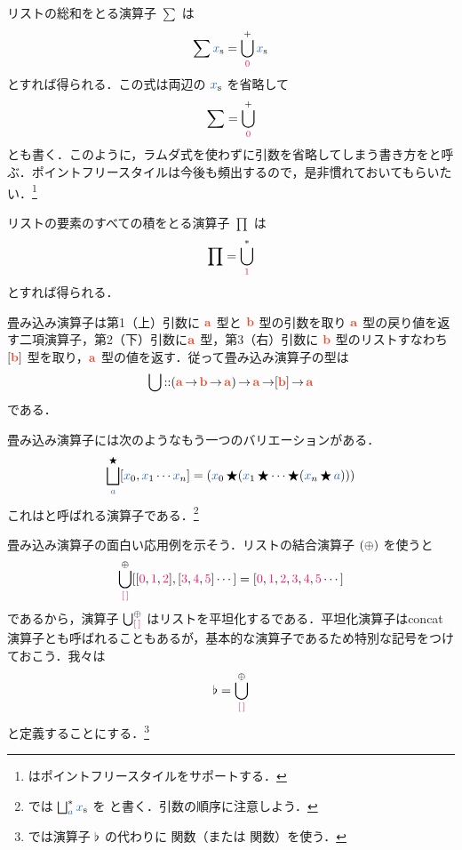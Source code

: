 \documentclass[a5paper,twoside,fleqn,draft]{jsbook}
\begin{document}
リストの総和をとる演算子 $\sum$ は
\begin{equation}
  \sum\mList{x}
  =\mFold^+_{\hConstant{0}}\mList{x}
\end{equation}
とすれば得られる．この式は両辺の $\mList{x}$ を省略して
\begin{equation}
  \sum
  =\mFold^+_{\hConstant{0}}
\end{equation}
とも書く．このように，ラムダ式を使わずに引数を省略してしまう書き方をと呼ぶ．ポイントフリースタイルは今後も頻出するので，是非慣れておいてもらいたい．\footnote{\haskell はポイントフリースタイルをサポートする．}

リストの要素のすべての積をとる演算子 $\prod$ は
\begin{equation}
  \prod
  =\mFold^*_{\hConstant{1}}
\end{equation}
とすれば得られる．

畳み込み演算子は第1（上）引数に $\mA$ 型と $\mB$ 型の引数を取り $\mA$ 型の戻り値を返す二項演算子，第2（下）引数に$\mA$ 型，第3（右）引数に $\mB$ 型のリストすなわち$[\mB]$ 型を取り，$\mA$ 型の値を返す．従って畳み込み演算子の型は
\begin{equation}
  \mFold
  \mIn(\mA\mFuncArrow\mB\mFuncArrow\mA)
  \mFuncArrow\mA
  \mFuncArrow[\mB]
  \mFuncArrow\mA
\end{equation}
である．

\separator

畳み込み演算子には次のようなもう一つのバリエーションがある．
\begin{equation}
  \mFoldRight^{\hAnyBinOp}_{\hVar{a}}[\hVar{x}_0,\hVar{x}_1\dotsb \hVar{x}_n]
  =(\hVar{x}_0\hAnyBinOp(\hVar{x}_1\hAnyBinOp\dotsb\hAnyBinOp(\hVar{x}_n\hAnyBinOp\hVar{a})))
\end{equation}
これはと呼ばれる演算子である．\footnote{\haskell では $\mFoldRight^{*}_{\hVar{a}}\mList{x}$ を  と書く．引数の順序に注意しよう．}

\separator

畳み込み演算子の面白い応用例を示そう．リストの結合演算子 $(\operatorname{\oplus})$ を使うと
\begin{equation}
  \mFold_\mEmptyList^{\mAppend}[[\hConstant{0},\hConstant{1},\mTwoNumber],[\mThreeNumber,\mFourNumber,\mFiveNumber]\dotsb]
  =[\hConstant{0},\hConstant{1},\mTwoNumber,\mThreeNumber,\mFourNumber,\mFiveNumber\dotsb]
\end{equation}
であるから，演算子 $\mFold_\mEmptyList^{\mAppend}$ はリストを平坦化するである．平坦化演算子はconcat演算子とも呼ばれることもあるが，基本的な演算子であるため特別な記号をつけておこう．我々は
\begin{equation}
  \mJoinList
  =\mFold_\mEmptyList^{\mAppend}
\end{equation}
と定義することにする．\footnote{\haskell では演算子 $\operatorname{\flat}$ の代わりに  関数（または  関数）を使う．}
\end{document}
